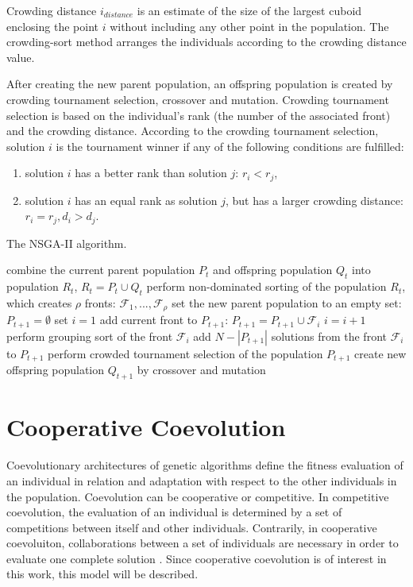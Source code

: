 Crowding distance $i_{distance}$ is an estimate of the size of the largest cuboid enclosing the point $i$ without including any other point in the population. 
The crowding-sort method arranges the individuals according to the crowding distance value.

After creating the new parent population, an offspring population is created by crowding tournament selection, crossover and mutation. 
Crowding tournament selection is based on the individual's rank (the number of the associated front) and the crowding distance. 
According to the crowding tournament selection, solution $i$ is the tournament winner if any of the following conditions are fulfilled:
\begin{enumerate}
	\item solution $i$ has a better rank than solution $j$: $r_i < r_j$,
	\item solution $i$ has an equal rank as solution $j$, but has a larger crowding distance: $r_i=r_j, d_i > d_j$.
\end{enumerate}

\begin{algorithm}
\caption{The NSGA-II algorithm.\label{nsga-ii}}
\begin{algorithmic}[1]
\State combine the current parent population $P_t$ and offspring population $Q_t$ into population $R_t$, $R_t = P_t \cup Q_t$
\State perform non-dominated sorting of the population $R_t$, which creates $\rho$ fronts: 
$\mathcal{F}_1, ..., \mathcal{F}_\rho$ 
\State set the new parent population to an empty set: $P_{t+1} = \emptyset$
\State set $i=1$
\State add current front to $P_{t+1}$: $P_{t+1} = P_{t+1} \cup \mathcal{F}_i$
\State $i=i+1$
\EndWhile
\State perform grouping sort of the front $\mathcal{F}_i$
\State add $N-|P_{t+1}|$ solutions from the front $\mathcal{F}_i$ to $P_{t+1}$
\State perform crowded tournament selection of the population $P_{t+1}$
\State create new offspring population $Q_{t+1}$ by crossover and mutation
\end{algorithmic}
\end{algorithm}

\section{Cooperative Coevolution}
Coevolutionary architectures of genetic algorithms define the fitness evaluation of an individual in relation and adaptation with respect to the other individuals in the population. 
Coevolution can be cooperative or competitive. 
In competitive coevolution, the evaluation of an individual is determined by a set of competitions between itself and other individuals. 
Contrarily, in cooperative coevoluiton, collaborations between a set of individuals are necessary in order to evaluate one complete solution \cite{stoean2014support}. 
Since cooperative coevolution is of interest in this work, this model will be described. 

